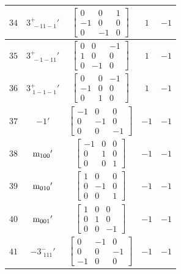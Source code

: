 \documentclass[fleqn,8pt]{jsarticle}
\begin{document}
\begin{longtable}{ccccc}
$ 34 $ & $ 3^{+}_{\,\,-11-1}{}' $ & $ \begin{bmatrix} 0 & 0 & 1 \\ -1 & 0 & 0 \\ 0 & -1 & 0 \end{bmatrix} $ & $ 1 $ & $ -1 $ \\ \hline
$ 35 $ & $ 3^{+}_{\,\,-1-11}{}' $ & $ \begin{bmatrix} 0 & 0 & -1 \\ 1 & 0 & 0 \\ 0 & -1 & 0 \end{bmatrix} $ & $ 1 $ & $ -1 $ \\ \hline
$ 36 $ & $ 3^{+}_{\,\,1-1-1}{}' $ & $ \begin{bmatrix} 0 & 0 & -1 \\ -1 & 0 & 0 \\ 0 & 1 & 0 \end{bmatrix} $ & $ 1 $ & $ -1 $ \\ \hline
$ 37 $ & $ -1{}' $ & $ \begin{bmatrix} -1 & 0 & 0 \\ 0 & -1 & 0 \\ 0 & 0 & -1 \end{bmatrix} $ & $ -1 $ & $ -1 $ \\ \hline
$ 38 $ & $ {\rm m}_{100}{}' $ & $ \begin{bmatrix} -1 & 0 & 0 \\ 0 & 1 & 0 \\ 0 & 0 & 1 \end{bmatrix} $ & $ -1 $ & $ -1 $ \\ \hline
$ 39 $ & $ {\rm m}_{010}{}' $ & $ \begin{bmatrix} 1 & 0 & 0 \\ 0 & -1 & 0 \\ 0 & 0 & 1 \end{bmatrix} $ & $ -1 $ & $ -1 $ \\ \hline
$ 40 $ & $ {\rm m}_{001}{}' $ & $ \begin{bmatrix} 1 & 0 & 0 \\ 0 & 1 & 0 \\ 0 & 0 & -1 \end{bmatrix} $ & $ -1 $ & $ -1 $ \\ \hline
$ 41 $ & $ -3^{-}_{\,\,111}{}' $ & $ \begin{bmatrix} 0 & -1 & 0 \\ 0 & 0 & -1 \\ -1 & 0 & 0 \end{bmatrix} $ & $ -1 $ & $ -1 $ \\ \hline

\end{longtable}
\end{document}
